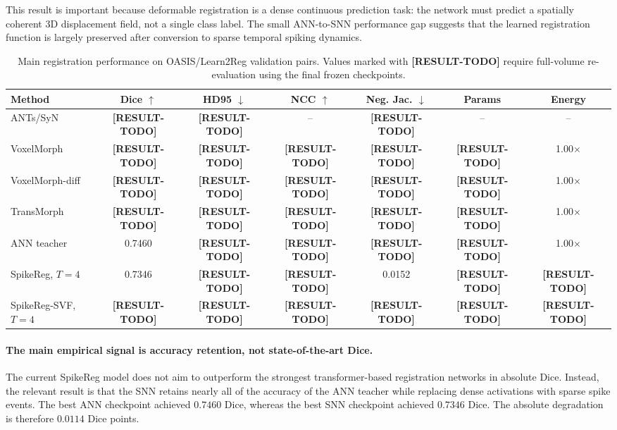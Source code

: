 This result is important because deformable registration is a dense continuous prediction task: the network must predict a spatially coherent 3D displacement field, not a single class label. The small ANN-to-SNN performance gap suggests that the learned registration function is largely preserved after conversion to sparse temporal spiking dynamics.

\begin{table}[t]
\centering
\caption{
Main registration performance on OASIS/Learn2Reg validation pairs. 
Values marked with \textbf{[RESULT-TODO]} require full-volume re-evaluation using the final frozen checkpoints.
}
\label{tab:main_results}
\begin{tabular}{lcccccc}
\hline
Method & Dice $\uparrow$ & HD95 $\downarrow$ & NCC $\uparrow$ & Neg. Jac. $\downarrow$ & Params & Energy \\
\hline
ANTs/SyN & \textbf{[RESULT-TODO]} & \textbf{[RESULT-TODO]} & -- & \textbf{[RESULT-TODO]} & -- & -- \\
VoxelMorph & \textbf{[RESULT-TODO]} & \textbf{[RESULT-TODO]} & \textbf{[RESULT-TODO]} & \textbf{[RESULT-TODO]} & \textbf{[RESULT-TODO]} & 1.00$\times$ \\
VoxelMorph-diff & \textbf{[RESULT-TODO]} & \textbf{[RESULT-TODO]} & \textbf{[RESULT-TODO]} & \textbf{[RESULT-TODO]} & \textbf{[RESULT-TODO]} & 1.00$\times$ \\
TransMorph & \textbf{[RESULT-TODO]} & \textbf{[RESULT-TODO]} & \textbf{[RESULT-TODO]} & \textbf{[RESULT-TODO]} & \textbf{[RESULT-TODO]} & 1.00$\times$ \\
\hline
ANN teacher & 0.7460 & \textbf{[RESULT-TODO]} & \textbf{[RESULT-TODO]} & \textbf{[RESULT-TODO]} & \textbf{[RESULT-TODO]} & 1.00$\times$ \\
SpikeReg, $T=4$ & 0.7346 & \textbf{[RESULT-TODO]} & \textbf{[RESULT-TODO]} & 0.0152 & \textbf{[RESULT-TODO]} & \textbf{[RESULT-TODO]} \\
SpikeReg-SVF, $T=4$ & \textbf{[RESULT-TODO]} & \textbf{[RESULT-TODO]} & \textbf{[RESULT-TODO]} & \textbf{[RESULT-TODO]} & \textbf{[RESULT-TODO]} & \textbf{[RESULT-TODO]} \\
\hline
\end{tabular}
\end{table}


\paragraph{The main empirical signal is accuracy retention, not state-of-the-art Dice.}
The current SpikeReg model does not aim to outperform the strongest transformer-based registration networks in absolute Dice. Instead, the relevant result is that the SNN retains nearly all of the accuracy of the ANN teacher while replacing dense activations with sparse spike events. The best ANN checkpoint achieved $0.7460$ Dice, whereas the best SNN checkpoint achieved $0.7346$ Dice. The absolute degradation is therefore $0.0114$ Dice points.

